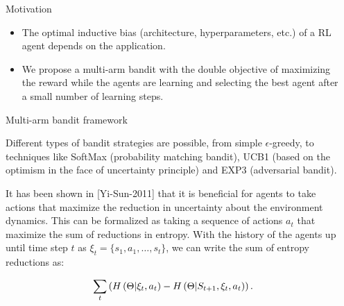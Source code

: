 \documentclass[final]{beamer}
\newlength{\sepwid}
\newlength{\onecolwid}
\begin{document}
\vspace*{-2.5cm}

\begin{frame}[t] %

\begin{columns}[t] 

\begin{column}{\sepwid}\end{column} %

\begin{column}{\onecolwid} %

\begin{block}{Motivation}
\begin{itemize}

\item The optimal inductive bias (architecture, hyperparameters, etc.) of a RL agent depends on the application. 
\item We propose a multi-arm bandit with the double objective of maximizing the reward while the agents are learning and selecting the best agent after a small number of learning steps. 
\end{itemize}

\end{block}
\vspace*{-0.5cm}

\begin{block}{Multi-arm bandit framework}

Different types of bandit strategies are possible, from simple $\epsilon$-greedy, to techniques like SoftMax (probability matching bandit), UCB1 (based on the optimism in the face of uncertainty principle) and EXP3 (adversarial bandit). 

\vspace*{0.5cm}

It has been shown in [Yi-Sun-2011] that it is beneficial for agents to take actions that maximize the reduction in uncertainty about the environment dynamics. This can be formalized as taking a sequence of actions $a_t$ that maximize the sum of reductions in entropy. With the history of the agents up until time step $t$ as $\xi_{t} = \{s_1 , a_1 , \dots , s_t \}$, we can write the sum of entropy reductions as:

\begin{equation}
        \sum_{t} \left( H\left(\bold\mathbf{\Theta}| \xi_{t}, a_t \right) - H \left(\bold\mathbf{\Theta} | S_{t+1}, \xi_{t}, a_t \right) \right). \label{eq:1}
\end{equation}


\end{block}
\end{column}
\end{columns}
\end{frame}
\end{document}
